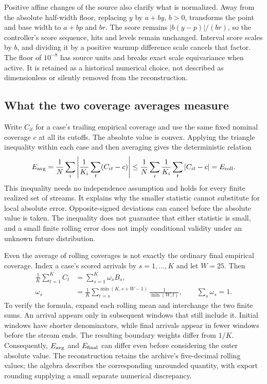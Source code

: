 Positive affine changes of the source also clarify what is normalized. Away from the absolute half-width floor, replacing $y$ by $a+b y$, $b>0$, transforms the point and base width to $a+b p$ and $b r$. The score remains $|b(y-p)|/(br)$, so the controller's score sequence, hits and levels remain unchanged. Interval score scales by $b$, and dividing it by a positive warmup difference scale cancels that factor. The floor of $10^{-8}$ has source units and breaks exact scale equivariance when active. It is retained as a historical numerical choice, not described as dimensionless or silently removed from the reconstruction.

\subsection{What the two coverage averages measure}
Write $C_{it}$ for a case's trailing empirical coverage and use the same fixed nominal coverage $c$ at all its cutoffs. The absolute value is convex. Applying the triangle inequality within each case and then averaging gives the deterministic relation
\begin{equation}\label{eq:replay-jensen}
 E_{\rm avg}=\frac1N\sum_i\left|\frac1{K_i}\sum_t(C_{it}-c)\right|
 \le \frac1N\sum_i\frac1{K_i}\sum_t|C_{it}-c|=E_{\rm roll}.
\end{equation}
This inequality needs no independence assumption and holds for every finite realized set of streams. It explains why the smaller statistic cannot substitute for local absolute error. Opposite-signed deviations can cancel before the absolute value is taken. The inequality does not guarantee that either statistic is small, and a small finite rolling error does not imply conditional validity under an unknown future distribution.

Even the average of rolling coverages is not exactly the ordinary final empirical coverage. Index a case's scored arrivals by $s=1,\ldots,K$ and let $W=25$. Then
\begin{align}\label{eq:replay-rolling-weights}
 \frac1K\sum_{t=1}^K C_t &=\sum_{s=1}^{K}\omega_s B_s,\\
 \omega_s&=\frac1K\sum_{t=s}^{\min(K,s+W-1)}\frac1{\min(W,t)},
 \qquad\sum_s\omega_s=1.
\end{align}
To verify the formula, expand each rolling mean and interchange the two finite sums. An arrival appears only in subsequent windows that still include it. Initial windows have shorter denominators, while final arrivals appear in fewer windows before the stream ends. The resulting boundary weights differ from $1/K$. Consequently, $E_{\rm avg}$ and $E_{\rm final}$ can differ even before considering the outer absolute value. The reconstruction retains the archive's five-decimal rolling values; the algebra describes the corresponding unrounded quantity, with export rounding supplying a small separate numerical discrepancy.

